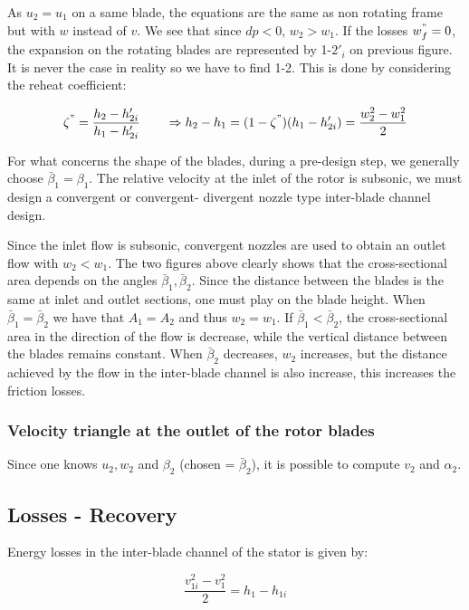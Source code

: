 As $u_2 = u_1$ on a same blade, the equations are the same as non rotating frame but with $w$ instead of $v$. We see that since $dp<0$, $w_2>w_1$. If the losses $w^"_f = 0$, the expansion on the rotating blades are represented by 1-$2'_i$ on previous figure. It is never the case in reality so we have to find 1-2. This is done by considering the reheat coefficient: 

\begin{equation}
\zeta^" = \frac{h_2 - h'_{2i}}{h_1 - h'_{2i}} \qquad \Rightarrow h_2 - h_1 = (1-\zeta ^") (h_1 - h'_{2i}) = \frac{w_2^2 - w_1 ^2}{2}
\end{equation}

For what concerns the shape of the blades, during a pre-design step, we generally choose $\bar{\beta}_1 = \beta _1$. The relative velocity at the inlet of the rotor is subsonic, we must design a convergent or convergent- divergent nozzle type inter-blade channel design. 


Since the inlet flow is subsonic, convergent nozzles are used to obtain an outlet flow with $w_2 < w_1$. The two figures above clearly shows that the cross-sectional area depends on the angles $\bar{\beta} _1, \bar{\beta} _2$. Since the distance between the blades is the same at inlet and outlet sections, one must play on the blade height. When $\bar{\beta} _1 = \bar{\beta} _2$ we have that $A_1 = A_2$ and thus $w_2 = w_1$. If $\bar{\beta} _1<\bar{\beta} _2$, the cross-sectional area in the direction of the flow is decrease, while the vertical distance between the blades remains constant. When $\bar{\beta} _2$ decreases, $w_2$ increases, but the distance achieved by the flow in the inter-blade channel is also increase, this increases the friction losses. 

\subsubsection{Velocity triangle at the outlet of the rotor blades}
Since one knows $u_2, w_2$ and $\beta _2$ (chosen = $\bar{\beta}_2$), it is possible to compute $v_2$ and $\alpha _2$. 

\subsection{Losses - Recovery}
Energy losses in the inter-blade channel of the stator is given by: 

\begin{equation}
\frac{v_{1i}^2-v_1^2}{2} = h_1 - h_{1i}
\end{equation}

